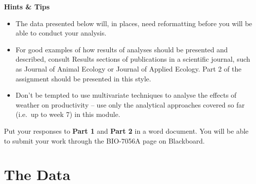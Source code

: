 \documentclass[
]{book}
\providecommand{\tightlist}{%
  \setlength{\itemsep}{0pt}\setlength{\parskip}{0pt}}
\begin{document}
\textbf{Hints \& Tips}

\begin{itemize}
\tightlist
\item
  The data presented below will, in places, need reformatting before you will be able to conduct your analysis.
\item
  For good examples of how results of analyses should be presented and described, consult Results sections of publications in a scientific journal, such as Journal of Animal Ecology or Journal of Applied Ecology. Part 2 of the assignment should be presented in this style.
\item
  Don't be tempted to use multivariate techniques to analyse the effects of weather on productivity -- use only the analytical approaches covered so far (i.e.~up to week 7) in this module.
\end{itemize}

Put your responses to \textbf{Part 1} and \textbf{Part 2} in a word document. You will be able to submit your work through the BIO-7056A page on Blackboard.

\section{The Data}\label{the-data-3}
\end{document}
